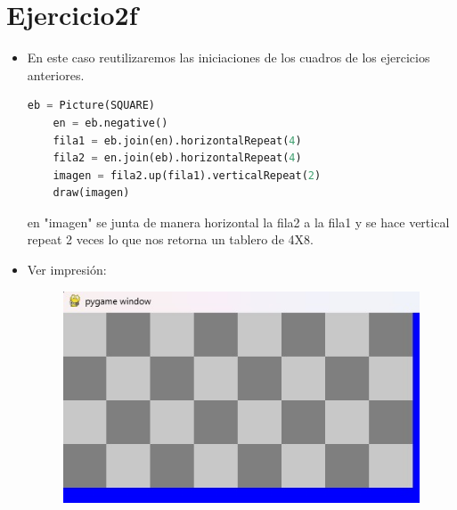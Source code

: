 \documentclass{article}
\begin{document}
\section{Ejercicio2f}
\begin{itemize}   
    \item En este caso reutilizaremos las iniciaciones de los cuadros de los ejercicios anteriores.
	
    \begin{lstlisting}[language=Python, caption={Creacion e impresion de medio tablero}, float=H]
	eb = Picture(SQUARE)
	en = eb.negative()
	fila1 = eb.join(en).horizontalRepeat(4)
	fila2 = en.join(eb).horizontalRepeat(4)
	imagen = fila2.up(fila1).verticalRepeat(2)
	draw(imagen)
    \end{lstlisting}
    en "imagen" se junta de manera horizontal la fila2 a la fila1 y se hace vertical repeat 2 veces lo que nos retorna un tablero de 4X8.
    \item Ver impresión:
	\begin{figure}[H]
		\centering
		\includegraphics[scale=0.3]{img/ejercicio2f.jpg}
	\end{figure}
\end{itemize}
\end{document}
